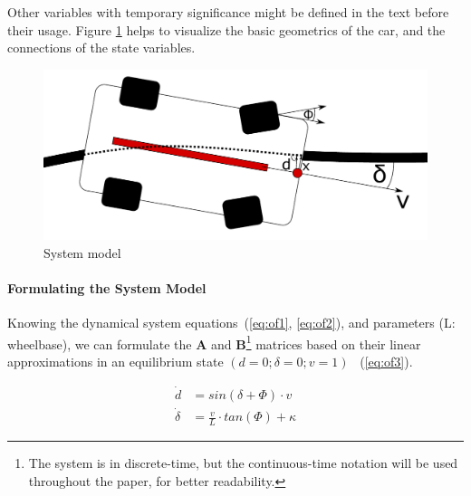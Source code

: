 Other variables with temporary significance might be defined in the text before their usage. Figure \ref{fig:cartop} helps to visualize the basic geometrics of the car, and the connections of the state variables.

\begin{figure}[!ht]
    \centering
    \includegraphics[width=0.7\linewidth]{img/cartop}
    \caption{System model}
    \label{fig:cartop}
\end{figure}

\paragraph{Formulating the System Model}

Knowing the dynamical system equations~(\ref{eq:of1}, \ref{eq:of2}), and parameters (L: wheelbase), we can formulate the \textbf{A} and \textbf{B}\footnote{The system is in discrete-time, but the continuous-time notation will be used throughout the paper, for better readability.} matrices based on their linear approximations in an equilibrium state $(d = 0; \delta = 0; v = 1)$ ~(\ref{eq:of3}).

\begin{align} 
    \dot{d} &= sin(\delta + \Phi) \cdot v  \label{eq:of1} \\ 
    \dot{\delta} &= \frac{v}{L} \cdot tan(\Phi) + \kappa \label{eq:of2}
\end{align}

